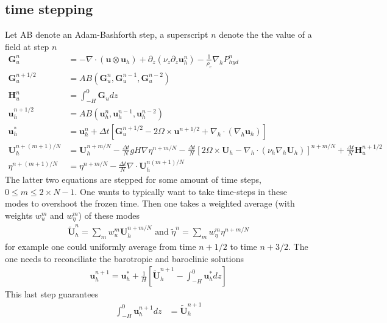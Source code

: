 \documentclass{article}
\begin{document}
\subsection{time stepping}
Let AB denote an Adam-Bashforth step, a superscript $n$ denote the the value of a field at step $n$
\begin{align}
    \bm{G}_u^n &= - \nabla \cdot \left( \bm{u} \otimes \bm{u}_h \right) + \partial_z \left(\nu_z \partial_z \bm{u}_h^n \right) - \frac{1}{\rho_c} \nabla_h P_{hyd}^n \\
    \bm{G}_u^{n+1/2} &= AB(\bm{G}_u^{n},\bm{G}_u^{n-1},\bm{G}_u^{n-2} )
    \\
    \bm{H}_u^{n} &= \int_{-H}^0 \bm{G}_u dz
    \\
    \bm{u}^{n+1/2}_h &= AB \left( \bm{u}^n_h, \bm{u}^{n-1}_h, \bm{u}^{n-2}_h \right)
    \\
    \bm{u}^*_h &= \bm{u}_h^n + \Delta t \left[ \bm{G}_u^{n+1/2} - 2 \Omega \times \bm{u}^{n+1/2} + \nabla_h \cdot \left(  \nabla_h \bm{u}_h \right)
   \right]
   \\
   \bm{U}_h^{n + (m+1)/N} &= \bm{U}_h^{n + m/N} - \frac{\Delta t}{N} g H \nabla \eta^{n + m /N} - \frac{\Delta t}{N} \left[ 2 \Omega \times \bm{U}_h - \nabla_h \cdot \left(\nu_h \nabla_h \bm{U}_h \right) \right]^{n + m / N} + \frac{\Delta t}{N} \bm{H}_u^{n+1/2} \\
   \eta^{n + (m+1)/N} &= \eta^{n+m/N} - \frac{\Delta t}{N} \nabla \cdot \bm{U}_h^{n (m+1)/N}
\end{align}
The latter two equations are stepped for some amount of time steps, $0 \leq m \leq 2 \times N-1$. One wants to typically want to take time-steps in these modes to overshoot the frozen time. Then one takes a weighted average (with weights $w^m_u$ and $w^m_\eta$) of these modes
\begin{align}
    \tilde{\bm{U}}_h^{n} = \sum_m w^m_u \bm{U}_h^{n + m / N} \text{ and } \tilde{\eta}^{n} = \sum_m w^m_\eta \eta^{n + m / N}
\end{align}
for example one could uniformly average from time $n+1/2$ to time $n + 3/2$. The one needs to reconciliate the barotropic and baroclinic solutions
\begin{align}
    \bm{u}^{n+1}_h =  \bm{u}^*_h + \frac{1}{H} \left[ \tilde{\bm{U}}_h^{n+1} - \int^0_{-H} \bm{u}^*_h dz \right]
\end{align}
This last step guarantees
\begin{align}
    \int_{-H}^0 \bm{u}^{n+1}_h dz &= \tilde{\bm{U}}_h^{n+1}
\end{align}
\end{document}
